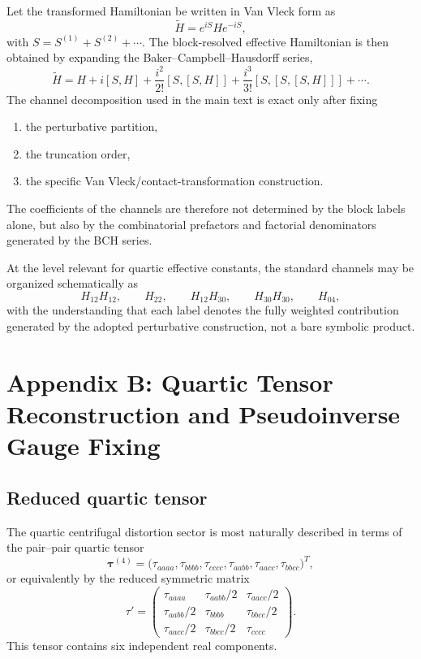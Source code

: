 \documentclass[aip,jcp,reprint,floatfix]{revtex4-2}
\begin{document}
Let the transformed Hamiltonian be written in Van Vleck form as
\begin{equation}
\widetilde H = e^{iS} H e^{-iS},
\end{equation}
with $S=S^{(1)}+S^{(2)}+\cdots$. The block-resolved effective Hamiltonian is
then obtained by expanding the Baker--Campbell--Hausdorff series,
\begin{equation}
\widetilde H
=
H + i[S,H] + \frac{i^2}{2!}[S,[S,H]] + \frac{i^3}{3!}[S,[S,[S,H]]] + \cdots .
\end{equation}
The channel decomposition used in the main text is exact only after fixing
\begin{enumerate}
\item the perturbative partition,
\item the truncation order,
\item the specific Van Vleck/contact-transformation construction.
\end{enumerate}
The coefficients of the channels are therefore not determined by the block
labels alone, but also by the combinatorial prefactors and factorial
denominators generated by the BCH series.

At the level relevant for quartic effective constants, the standard channels
may be organized schematically as
\begin{equation}
H_{12}H_{12},\qquad H_{22},\qquad H_{12}H_{30},\qquad H_{30}H_{30},\qquad H_{04},
\end{equation}
with the understanding that each label denotes the fully weighted contribution
generated by the adopted perturbative construction, not a bare symbolic
product.

\section{Appendix B: Quartic Tensor Reconstruction and Pseudoinverse Gauge Fixing}

\subsection{Reduced quartic tensor}

The quartic centrifugal distortion sector is most naturally described in terms
of the pair--pair quartic tensor
\begin{equation}
\boldsymbol\tau^{(4)} =
\bigl(
\tau_{aaaa},\tau_{bbbb},\tau_{cccc},
\tau_{aabb},\tau_{aacc},\tau_{bbcc}
\bigr)^T ,
\end{equation}
or equivalently by the reduced symmetric matrix
\begin{equation}
\tau'=
\begin{pmatrix}
\tau_{aaaa} & \tau_{aabb}/2 & \tau_{aacc}/2 \\
\tau_{aabb}/2 & \tau_{bbbb} & \tau_{bbcc}/2 \\
\tau_{aacc}/2 & \tau_{bbcc}/2 & \tau_{cccc}
\end{pmatrix}.
\end{equation}
This tensor contains six independent real components.
\end{document}
